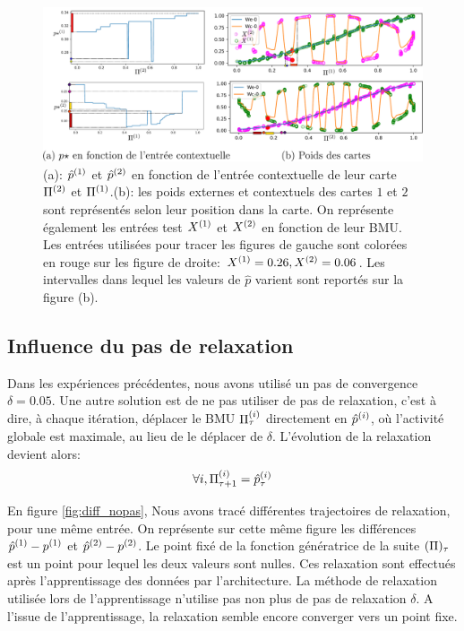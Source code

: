 \documentclass[../main]{subfiles}
\begin{document}
\begin{figure}
	\includegraphics[width=\textwidth]{am_w_006}
	\caption{(a): $\hat{p}^{({1})}$ et $\hat{p}^{({2})}$ en fonction de l'entrée contextuelle de leur carte $\Pi^{({2})}$ et $\Pi^{({1})}$.(b): les poids externes et contextuels des cartes $1$ et $2$ sont représentés selon leur position dans la carte. On représente également les entrées test $X^{({1})}$ et $X^{({2})}$ en fonction de leur BMU. Les entrées utilisées pour tracer les figures de gauche sont colorées en rouge sur les figure de droite: $X^{({1})}=0.26,X^{({2})}=0.06$. Les intervalles dans lequel les valeurs de $\hat{p}$ varient sont reportés sur la figure (b).}
	\label{fig:w006}
	\end{figure}

\subsection{Influence du pas de relaxation}

Dans les expériences précédentes, nous avons utilisé un pas de convergence $\delta=0.05$. 
Une autre solution est de ne pas utiliser de pas de relaxation, c'est à dire, à chaque itération, déplacer le BMU $\Pi^{({i})}_\tau$ directement en $\hat{p}^{({i})}$, où l'activité globale est maximale, au lieu de le déplacer de $\delta$.
L'évolution de la relaxation devient alors:
\begin{equation}
\forall i, \Pi^{({i})}_{\tau+1} = \hat{p}^{({i})}_{\tau}
\end{equation}

En figure \ref{fig:diff_nopas}, Nous avons tracé différentes trajectoires de relaxation, pour une même entrée. 
On représente sur cette même figure les différences ${\hat{p}}^{({1})} - p^{({1})}$ et ${\hat{p}}^{({2})} - p^{({2})}$. Le point fixé de la fonction génératrice de la suite $(\Pi)_\tau$ est un point pour lequel les deux valeurs sont nulles.
Ces relaxation sont effectués après l'apprentissage des données par l'architecture. La méthode de relaxation utilisée lors de l'apprentissage n'utilise pas non plus de pas de relaxation $\delta$.
A l'issue de l'apprentissage, la relaxation semble encore converger vers un point fixe.
\end{document}
